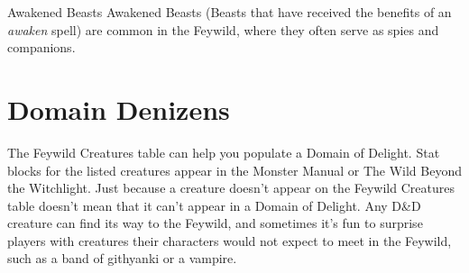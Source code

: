 \documentclass[10pt,a4paper,twoside,twocolumn,openany,nodeprecatedcode,bg=print]{dndbook}
\begin{document}
\begin{DndComment}{Awakened Beasts}
Awakened Beasts (Beasts that have received the benefits of an \textit{awaken} spell) are common in the Feywild, where they often serve as spies and companions.
\end{DndComment}

\section{Domain Denizens}
The Feywild Creatures table can help you populate a Domain of Delight. Stat blocks for the listed creatures appear in the Monster Manual or The Wild Beyond the Witchlight.
Just because a creature doesn't appear on the Feywild Creatures table doesn't mean that it can't appear in a Domain of Delight. Any D\&D creature can find its way to the Feywild, and sometimes it's fun to surprise players with creatures their characters would not expect to meet in the Feywild, such as a band of githyanki or a vampire.
\end{document}

